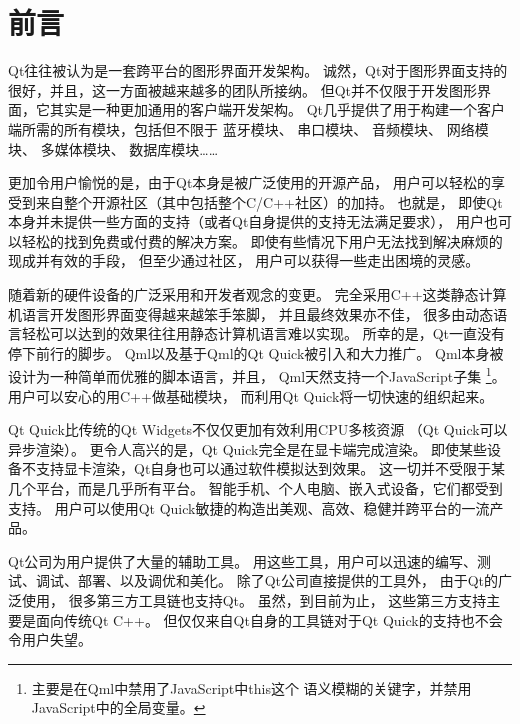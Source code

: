 ﻿%






\cleardoublepage                              %
\setcounter{secnumdepth}{-2}                  %
\chapter{
前言
}\label{c000020}
\setcounter{secnumdepth}{4}                   %


Qt往往被认为是一套跨平台的图形界面开发架构。
诚然，Qt对于图形界面支持的很好，并且，这一方面被越来越多的团队所接纳。
但Qt并不仅限于开发图形界面，它其实是一种更加通用的客户端开发架构。
Qt几乎提供了用于构建一个客户端所需的所有模块，包括但不限于
蓝牙模块、
串口模块、
音频模块、
网络模块、
多媒体模块、
数据库模块……

更加令用户愉悦的是，由于Qt本身是被广泛使用的开源产品，
用户可以轻松的享受到来自整个开源社区（其中包括整个C/C++社区）的加持。
也就是，
即使Qt本身并未提供一些方面的支持（或者Qt自身提供的支持无法满足要求），
用户也可以轻松的找到免费或付费的解决方案。
即使有些情况下用户无法找到解决麻烦的现成并有效的手段，
但至少通过社区，
用户可以获得一些走出困境的灵感。

随着新的硬件设备的广泛采用和开发者观念的变更。
完全采用C++这类静态计算机语言开发图形界面变得越来越笨手笨脚，
并且最终效果亦不佳，
很多由动态语言轻松可以达到的效果往往用静态计算机语言难以实现。
所幸的是，Qt一直没有停下前行的脚步。
Qml以及基于Qml的Qt Quick被引入和大力推广。
Qml本身被设计为一种简单而优雅的脚本语言，并且，
Qml天然支持一个JavaScript子集
\footnote{
主要是在Qml中禁用了JavaScript中this这个
语义模糊的关键字，并禁用JavaScript中的全局变量。
}。
用户可以安心的用C++做基础模块，
而利用Qt Quick将一切快速的组织起来。


Qt Quick比传统的Qt Widgets不仅仅更加有效利用CPU多核资源
（Qt Quick可以异步渲染）。
更令人高兴的是，Qt Quick完全是在显卡端完成渲染。
即使某些设备不支持显卡渲染，Qt自身也可以通过软件模拟达到效果。
这一切并不受限于某几个平台，而是几乎所有平台。
智能手机、个人电脑、嵌入式设备，它们都受到支持。
用户可以使用Qt Quick敏捷的构造出美观、高效、稳健并跨平台的一流产品。

Qt公司为用户提供了大量的辅助工具。
用这些工具，用户可以迅速的编写、测试、调试、部署、以及调优和美化。
除了Qt公司直接提供的工具外，
由于Qt的广泛使用，
很多第三方工具链也支持Qt。
虽然，到目前为止，
这些第三方支持主要是面向传统Qt C++。
但仅仅来自Qt自身的工具链对于Qt Quick的支持也不会令用户失望。


